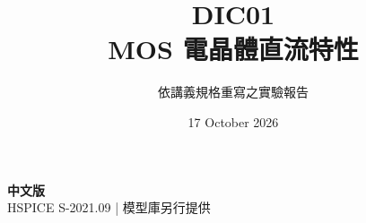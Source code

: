 \documentclass[11pt,a4paper]{article}
\title{\color{accent}DIC01\\[4pt]MOS 電晶體直流特性}
\author{依講義規格重寫之實驗報告}
\date{17 October 2026}
\begin{document}
\maketitle
\begin{center}\small\textbf{中文版}\\
HSPICE S-2021.09 \quad | \quad 模型庫另行提供
\end{center}


\end{document}
